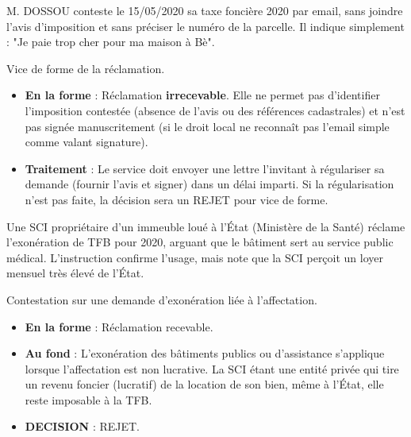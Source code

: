 \documentclass[a4paper, 11pt]{exam}
\begin{document}
\begin{questions}
		\question M. DOSSOU conteste le 15/05/2020 sa taxe foncière 2020 par email, sans joindre l'avis d'imposition et sans préciser le numéro de la parcelle. Il indique simplement : "Je paie trop cher pour ma maison à Bè".
		\begin{solution}
			Vice de forme de la réclamation.
			\begin{itemize}
				\item \textbf{En la forme} : Réclamation \textbf{irrecevable}. Elle ne permet pas d'identifier l'imposition contestée (absence de l'avis ou des références cadastrales) et n'est pas signée manuscritement (si le droit local ne reconnaît pas l'email simple comme valant signature).
				\item \textbf{Traitement} : Le service doit envoyer une lettre l'invitant à régulariser sa demande (fournir l'avis et signer) dans un délai imparti. Si la régularisation n'est pas faite, la décision sera un REJET pour vice de forme.
			\end{itemize}
		\end{solution}
		
		\question Une SCI propriétaire d'un immeuble loué à l'État (Ministère de la Santé) réclame l'exonération de TFB pour 2020, arguant que le bâtiment sert au service public médical. L'instruction confirme l'usage, mais note que la SCI perçoit un loyer mensuel très élevé de l'État.
		\begin{solution}
			Contestation sur une demande d'exonération liée à l'affectation.
			\begin{itemize}
				\item \textbf{En la forme} : Réclamation recevable.
				\item \textbf{Au fond} : L'exonération des bâtiments publics ou d'assistance s'applique lorsque l'affectation est non lucrative. La SCI étant une entité privée qui tire un revenu foncier (lucratif) de la location de son bien, même à l'État, elle reste imposable à la TFB.
				\item \textbf{DECISION} : REJET.
			\end{itemize}
		\end{solution}
		

\end{questions}
\end{document}
